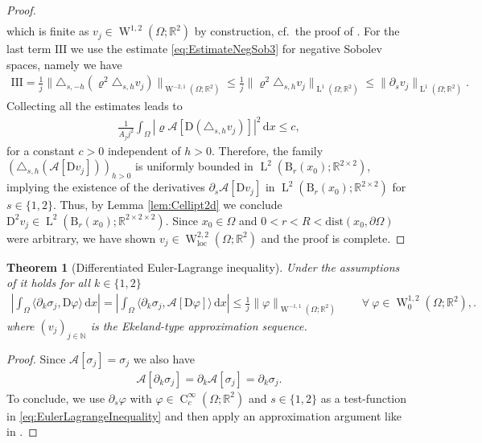 \documentclass[a4paper,10pt,reqno,oneside]{amsart}
\numberwithin{equation}{section}
\newcommand{\R}{\mathbb R}
\newcommand{\N}{\mathbb N}
\newcommand{\ball}{\mathrm{B}}
\newcommand{\A}{\mathscr{A}}
\newcommand{\lebe}{\operatorname{L}}
\newcommand{\sobo}{\operatorname{W}}
\newcommand{\hold}{\operatorname{C}}
\newcommand{\loc}{\mathrm{loc}}
\newcommand{\D}{\mathrm{D}}
\newcommand{\dx}[1]{\,\mathrm{d}#1}
\newcommand{\del}{\partial}
\newcommand{\skalarProd}[2]{\big\langle#1,#2\big\rangle}
\newcommand{\abs}[1]{\left\lvert#1\right\rvert}
\newtheorem{thm}{Theorem}[section]
\begin{document}
\begin{proof}
\begin{align*}
 	\end{align*}
 	which is finite as $v_j\in\sobo^{1,2}(\Omega;\R^2)$ by construction, cf.~the proof of . For the last term $\mathrm{III}$ we use the estimate \eqref{eq:EstimateNegSob3} for negative Sobolev spaces, namely we have
 	\begin{align*}
 		\mathrm{III} = \frac{1}{j} \|\triangle_{s,-h}(\varrho^2 \triangle_{s,h} v_j)\|_{\sobo^{-2,1}(\Omega;\R^2)}\leq \frac{1}{j} \|\varrho^2 \triangle_{s,h} v_j\|_{\lebe^1(\Omega;\R^2)} \leq \|\del_s v_j\|_{\lebe^1(\Omega;\R^2)}. 
 	\end{align*}
 	Collecting all the estimates leads to
 	\begin{align*}
 		\frac{1}{A_j j^2} \int_\Omega \abs{\varrho \A[\D (\triangle_{s,h}v_j)]}^2 \dx{x} \leq c, 
 	\end{align*}
 for a constant $c>0$ independent of $h>0$. Therefore, the family $(\triangle_{s,h}(\A[\D v_j]))_{h>0}$ is uniformly bounded in $\lebe^2(\ball_{r}(x_0);\R^{2\times2})$, implying the existence of the derivatives $\del_s \A[\D v_j]$ in $\lebe^2(\ball_{r}(x_0);\R^{2\times2})$ for $s\in\{1,2\}$. Thus, by Lemma \ref{lem:Cellipt2d} we conclude $\D^2 v_j\in\lebe^2(\ball_{r}(x_0);\R^{2\times2\times2})$. Since $x_0\in\Omega$ and $0<r<R<\mathrm{dist}(x_0,\del\Omega)$ were arbitrary, we have shown $v_j\in\sobo^{2,2}_\loc(\Omega;\R^2)$ and the proof is complete. 
\end{proof}
\begin{thm}[Differentiated Euler-Lagrange inequality]\label{thm:DiffEulerLagrangeInequality}
Under the assumptions of 	it holds for all $k\in\{1,2\}$
	\begin{align*}
		\left\vert \int_\Omega \skalarProd{\partial_k\sigma_j}{\D \varphi}\dx{x}\right\vert =\left\vert \int_\Omega \skalarProd{\partial_k\sigma_j}{\A[\D \varphi]}\dx{x}\right\vert \leq \frac{1}{j}\|\varphi\|_{\sobo^{-1,1}(\Omega;\R^2)} \qquad \forall\ \varphi\in\sobo^{1,2}_0(\Omega;\R^2),.
	\end{align*}
where $(v_j)_{j\in\N}$ is the Ekeland-type approximation sequence. 
\end{thm}
\begin{proof}
	Since $\A[\sigma_j]=  \sigma_j$ we also have
	\begin{align}\label{eq:DerivativeSigma}
		\A[\partial_k\sigma_j]=\partial_k\A[\sigma_j]=\partial_k\sigma_j.
	\end{align}
	To conclude, we use $\del_s \varphi$ with $\varphi\in\hold^\infty_c(\Omega;\R^2)$ and $s\in\{1,2\}$ as a test-function in \eqref{eq:EulerLagrangeInequality}  and then apply an approximation argument like in \cite[Lemma 4.4]{Gmeineder}.
\end{proof}
\end{document}
